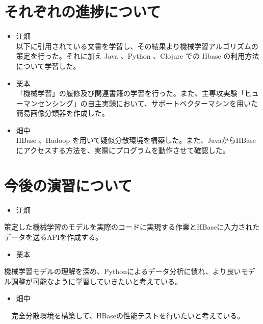 \documentclass{scrartcl}
\begin{document}
\begin{table}[htbp]
\section{それぞれの進捗について}
\label{sec:org4e0996c}
\begin{itemize}
\item 江畑\\
以下に引用されている文書を学習し、その結果より機械学習アルゴリズムの策定を行った。それに加え Java 、Python 、Clojure での Hbase の利用方法について学習した。\\
\item 栗本\\
「機械学習」の履修及び関連書籍の学習を行った。また、主専攻実験「ヒューマンセンシング」の自主実験において、サポートベクターマシンを用いた簡易画像分類器を作成した。\\
\item 畑中\\
HBase 、Hadoop を用いて疑似分散環境を構築した。また、JavaからHBaseにアクセスする方法を、実際にプログラムを動作させて確認した。\\
\end{itemize}


\section{今後の演習について}
\label{sec:orgf289936}
\begin{itemize}
\item 江畑\\
\end{itemize}
策定した機械学習のモデルを実際のコードに実現する作業とHBaseに入力されたデータを送るAPIを作成する。\\
\begin{itemize}
\item 栗本\\
\end{itemize}
機械学習モデルの理解を深め、Pythonによるデータ分析に慣れ、より良いモデル調整が可能なように学習していきたいと考えている。\\
\begin{itemize}
\item 畑中\\
\end{itemize}
　完全分散環境を構築して、HBaseの性能テストを行いたいと考えている。\\




\end{table}
\end{document}

